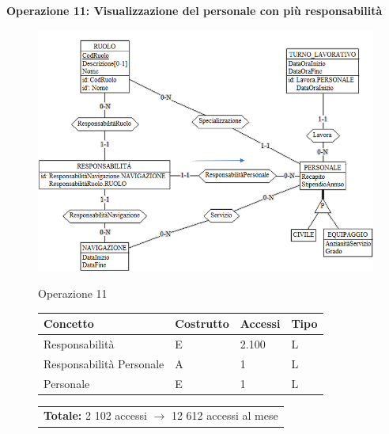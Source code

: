 \documentclass[a4paper, titlepage]{report}
\begin{document}
\newpage
	\noindent
	\textbf{{\large {Operazione 11: }}}\textbf{Visualizzazione del personale con più responsabilità}
	 \vspace{0.5cm}
	\begin{figure}[h]
		\centering
		\includegraphics[scale=0.7]{images/SchNav04.png}		
	\end{figure}
	\vspace{0.5cm}
	\begin{figure}[h]
		\centering
		Operazione 11\\
		\begin{tabular}{L{3cm}C{2.5cm}C{4.5cm}C{2.5cm}}
			\rule[-2mm]{0mm}{0.65cm}{}
			\textbf{Concetto} & \textbf{Costrutto} &\textbf{Accessi} & \textbf{Tipo} \\
			\hline\rule[-2mm]{0mm}{0.65cm}{}
			Responsabilità & E & 2.100 & L \\
			\hline\rule[-2mm]{0mm}{0.65cm}{}
			Responsabilità Personale & A & 1 & L \\
			\hline\rule[-2mm]{0mm}{0.65cm}{}
			Personale & E & 1 & L \\
		\end{tabular}
		\begin{tabular}{C{13.9cm}}
			\rule[-4mm]{0mm}{1cm}{}	
			 \textbf{Totale:} 2 102 accessi $\to$ 12 612 accessi al mese
		\end{tabular}
	\end{figure}
	
\end{document}
